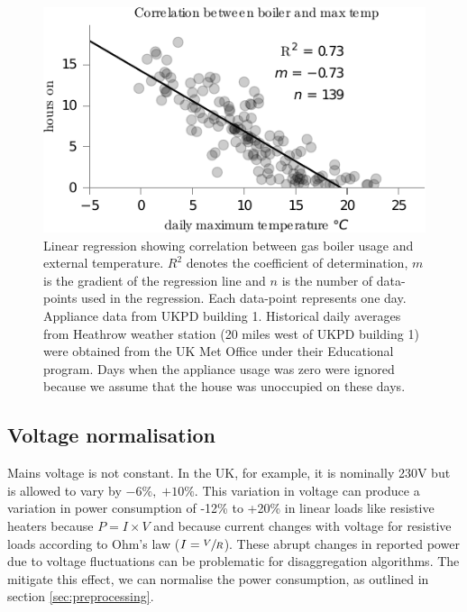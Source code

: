 \documentclass{sig-alternate}
\begin{document}
\begin{figure}[!t]
  \centering
  \includegraphics[width=\columnwidth]{figures/weather_correlations2.pdf} 
  \caption{Linear regression showing correlation between gas boiler
    usage and external temperature. $R^2$ denotes the coefficient of
    determination, $m$ is the gradient of the regression line and $n$
    is the number of data-points used in the regression.  Each
    data-point represents one day.  Appliance
    data from UKPD building 1.  Historical daily averages from
    Heathrow weather station (20 miles west of UKPD building 1) were
    obtained from the UK Met Office under their Educational program.
    Days when the appliance usage was zero were ignored because
    we assume that the house was unoccupied on these days.}
  \label{fig:weather_correlations} 
\end{figure}

\subsection{Voltage normalisation} %

\noindent
Mains voltage is not constant.  In the UK, for example, it is nominally 230\;V but is allowed to vary by
$-6\%,\;{+10}\%$.  This variation in voltage can produce a variation in power consumption of -12\% to +20\% in linear loads like resistive heaters because $P=I \times V$ and because current changes with voltage
for resistive loads according to Ohm's law ($I=\sfrac{V}{R}$).
These abrupt changes in reported power due to voltage fluctuations can be
problematic for disaggregation algorithms.  The mitigate this effect, we can normalise the power consumption, as outlined in section \ref{sec:preprocessing}.
\end{document}
